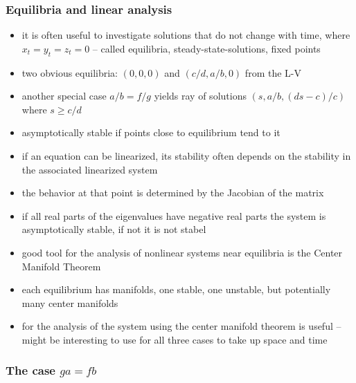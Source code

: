 \documentclass[a4paper,reqno,11pt]{article}
\begin{document}
\subsubsection{Equilibria and linear analysis}

\begin{itemize}
    \item it is often useful to investigate solutions that do not change with
        time, where $x_t = y_t = z_t = 0$ -- called equilibria,
        steady-state-solutions, fixed points
    \item two obvious equilibria: $(0,0,0)$ and $(c/d, a/b,0)$ from the L-V
    \item another special case $a/b=f/g$ yields ray of solutions $(s,
        a/b,(ds-c)/c)$ where $s \ge c/d$
    \item asymptotically stable if points close to equilibrium tend to it
    \item if an equation can be linearized, its stability often depends on the
        stability in the associated linearized system
    \item the behavior at that point is determined by the Jacobian of the
        matrix
    \item if all real parts of the eigenvalues have negative real parts the
        system is asymptotically stable, if not it is not stabel
    \item good tool for the analysis of nonlinear systems near equilibria is
        the Center Manifold Theorem
    \item each equilibrium has manifolds, one stable, one unstable, but
        potentially many center manifolds
    \item for the analysis of the system using the center manifold theorem is
        useful -- might be interesting to use for all three cases to take up
        space and time
\end{itemize}

\subsubsection{The case $ga = fb$}
\end{document}
